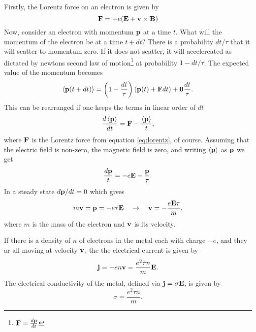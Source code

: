 \documentclass[11pt]{amsart}
\begin{document}
Firstly, the Lorentz force on an electron is given by
\begin{equation}
\label{eq:lorentz}
\vb{F} = -e(\vb{E} + \vb{v} \times \vb{B})
\end{equation}
Now, consider an electron with momentum $\vb{p}$ at a time $t$. What will the momentum of the electron be at a time $t + dt$? There is a probability $dt/\tau$ that it will scatter to momentum zero. If it does not scatter, it will accelereated as dictated by newtons second law of motion\footnote{$\vb{F} = \frac{d\vb{p}}{dt}$} at probability $1 - dt/\tau$. The expected value of the momentum becomes 
\begin{equation}
\ev{\vb{p}(t + dt)} = \left( 1- \frac{dt}{\tau} \right) (\vb{p}(t) + \vb{F}dt) + \vb{0}\frac{dt}{\tau}.
\end{equation}
This can be rearranged if one keeps the terms in linear order of $dt$
\begin{equation}
\frac{d \ev{\vb{p}}}{dt} = \vb{F} - \frac{\ev{\vb{p}}}{t},
\end{equation}
where $\vb{F}$ is the Lorentz force from equation \ref{eq:lorentz}, of course. Assuming that the electric field is non-zero, the magnetic field is zero, and writing $\ev{\vb{p}}$ as $\vb{p}$ we get
\begin{equation}
\frac{d\vb{p}}{t} = -e\vb{E} -\frac{\vb{p}}{\tau}.
\end{equation}
In a steady state $d\vb{p}/dt= 0$ which gives
\begin{equation}
m\vb{v} = \vb{p} = -e\tau \vb{E} \quad \rightarrow \quad \vb{v} = -\frac{e\vb{E}\tau}{m},
\end{equation}
where $m$ is the mass of the electron and $\vb{v}$ is its velocity.

If there is a density of $n$ of electrons in the metal each with charge $-e$, and they ar all moving at velocity $\vb{v}$, the the electrical current is given by
\begin{equation}
\vb{j} = -en\vb{v} = \frac{e^2\tau n}{m}\vb{E}.
\end{equation}
The electrical conductivity of the metal, defined via $\vb{j} = \sigma\vb{E}$, is given by
\begin{equation}
\label{eq:electricalconductivity}
\sigma = \frac{e^2\tau n}{m}.
\end{equation}
\end{document}
